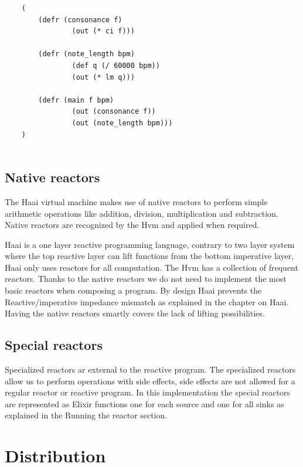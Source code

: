 \documentclass[a4paper]{book}
\begin{document}
\begin{verbatim}
	(
		(defr (consonance f)
		     	(out (* ci f)))
	
	    (defr (note_length bpm)
	      		(def q (/ 60000 bpm))
	            (out (* lm q)))
	
	    (defr (main f bpm)
	      		(out (consonance f))
	      		(out (note_length bpm)))
	)
	
\end{verbatim}

\section{Native reactors}
The Haai virtual machine makes use of native reactors to perform simple arithmetic operations like addition, division, multiplication and subtraction. Native reactors are recognized by the Hvm and applied when required.

Haai is a one layer reactive programming language, contrary to two layer system where the top reactive layer can lift functions from the bottom imperative layer, Haai only uses reactors for all computation. The Hvm has a collection of frequent reactors. Thanks to the native reactors we do not need to implement the most basic reactors when composing a program. By design Haai prevents the Reactive/imperative impedance mismatch as explained in the chapter on Haai. Having the native reactors smartly covers the lack of lifting possibilities.

\section{Special reactors}
Specialized reactors ar external to the reactive program. The specialized reactors allow us to perform operations with side effects, side effects are not allowed for a regular reactor or reactive program.
In this implementation the special reactors are represented as Elixir functions one for each source and one for all sinks as explained in the Running the reactor section.

\chapter{Distribution}
\end{document}
